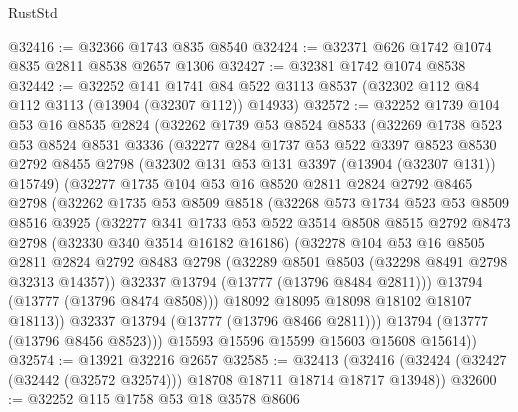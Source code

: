 \begin{lexlean}{RustStd}
\begin{coremodule}
@32416 := @32366 @1743 @835 @8540
@32424 := @32371 @626 @1742 @1074 @835 @2811 @8538 @2657 @1306
@32427 := @32381 @1742 @1074 @8538
@32442 := @32252
    @141
    @1741
    @84
    @522
    @3113
    @8537
    (@32302 @112 @84 @112 @3113 (@13904 (@32307 @112)) @14933)
@32572 := @32252
    @1739
    @104
    @53
    @16
    @8535
    @2824
    (@32262
      @1739
      @53
      @8524
      @8533
      (@32269
        @1738
        @523
        @53
        @8524
        @8531
        @3336
        (@32277
          @284
          @1737
          @53
          @522
          @3397
          @8523
          @8530
          @2792
          @8455
          @2798
          (@32302 @131 @53 @131 @3397 (@13904 (@32307 @131)) @15749)
          (@32277
            @1735
            @104
            @53
            @16
            @8520
            @2811
            @2824
            @2792
            @8465
            @2798
            (@32262
              @1735
              @53
              @8509
              @8518
              (@32268
                @573
                @1734
                @523
                @53
                @8509
                @8516
                @3925
                (@32277
                  @341
                  @1733
                  @53
                  @522
                  @3514
                  @8508
                  @8515
                  @2792
                  @8473
                  @2798
                  (@32330 @340 @3514 @16182 @16186)
                  (@32278
                    @104
                    @53
                    @16
                    @8505
                    @2811
                    @2824
                    @2792
                    @8483
                    @2798
                    (@32289 @8501 @8503 (@32298 @8491 @2798 @32313 @14357))
                    @32337
                    @13794
                    (@13777 (@13796 @8484 @2811)))
                  @13794
                  (@13777 (@13796 @8474 @8508)))
                @18092
                @18095
                @18098
                @18102
                @18107
                @18113))
            @32337
            @13794
            (@13777 (@13796 @8466 @2811)))
          @13794
          (@13777 (@13796 @8456 @8523)))
        @15593
        @15596
        @15599
        @15603
        @15608
        @15614))
@32574 := @13921 @32216 @2657
@32585 := @32413
    (@32416 (@32424 (@32427 (@32442 (@32572 @32574))) @18708 @18711 @18714 @18717 @13948))
@32600 := @32252
    @115
    @1758
    @53
    @18
    @3578
    @8606

\end{coremodule}
\end{lexlean}
